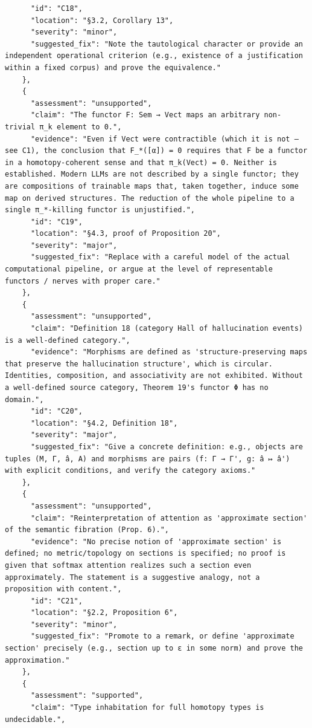 \documentclass[11pt]{article}
\begin{document}
\begin{verbatim}
      "id": "C18",
      "location": "§3.2, Corollary 13",
      "severity": "minor",
      "suggested_fix": "Note the tautological character or provide an independent operational criterion (e.g., existence of a justification within a fixed corpus) and prove the equivalence."
    },
    {
      "assessment": "unsupported",
      "claim": "The functor F: Sem → Vect maps an arbitrary non-trivial π_k element to 0.",
      "evidence": "Even if Vect were contractible (which it is not — see C1), the conclusion that F_*([α]) = 0 requires that F be a functor in a homotopy-coherent sense and that π_k(Vect) = 0. Neither is established. Modern LLMs are not described by a single functor; they are compositions of trainable maps that, taken together, induce some map on derived structures. The reduction of the whole pipeline to a single π_*-killing functor is unjustified.",
      "id": "C19",
      "location": "§4.3, proof of Proposition 20",
      "severity": "major",
      "suggested_fix": "Replace with a careful model of the actual computational pipeline, or argue at the level of representable functors / nerves with proper care."
    },
    {
      "assessment": "unsupported",
      "claim": "Definition 18 (category Hall of hallucination events) is a well-defined category.",
      "evidence": "Morphisms are defined as 'structure-preserving maps that preserve the hallucination structure', which is circular. Identities, composition, and associativity are not exhibited. Without a well-defined source category, Theorem 19's functor Φ has no domain.",
      "id": "C20",
      "location": "§4.2, Definition 18",
      "severity": "major",
      "suggested_fix": "Give a concrete definition: e.g., objects are tuples (M, Γ, â, A) and morphisms are pairs (f: Γ → Γ', g: â ↦ â') with explicit conditions, and verify the category axioms."
    },
    {
      "assessment": "unsupported",
      "claim": "Reinterpretation of attention as 'approximate section' of the semantic fibration (Prop. 6).",
      "evidence": "No precise notion of 'approximate section' is defined; no metric/topology on sections is specified; no proof is given that softmax attention realizes such a section even approximately. The statement is a suggestive analogy, not a proposition with content.",
      "id": "C21",
      "location": "§2.2, Proposition 6",
      "severity": "minor",
      "suggested_fix": "Promote to a remark, or define 'approximate section' precisely (e.g., section up to ε in some norm) and prove the approximation."
    },
    {
      "assessment": "supported",
      "claim": "Type inhabitation for full homotopy types is undecidable.",

\end{verbatim}
\end{document}
